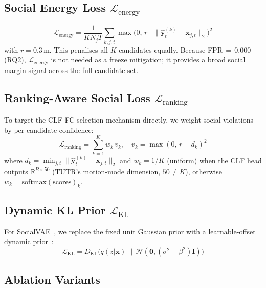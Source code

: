 \documentclass[journal]{IEEEtran}
\begin{document}
\subsection{Social Energy Loss $\mathcal{L}_{\text{energy}}$}

\begin{equation}
  \mathcal{L}_{\text{energy}} = \frac{1}{KN_jT}
  \sum_{k,j,t}\max\!\bigl(0,\,r-\|\hat{\mathbf{y}}^{(k)}_t
  -\mathbf{x}_{j,t}\|_2\bigr)^2
  \label{eq:lenergy}
\end{equation}
with $r{=}0.3$\,m. This penalises all $K$ candidates equally.
Because FPR\,\(=\,0.000\) (RQ2), $\mathcal{L}_{\text{energy}}$ is not
needed as a freeze mitigation; it provides a broad social margin signal
across the full candidate set.

\subsection{Ranking-Aware Social Loss $\mathcal{L}_{\text{ranking}}$}

To target the CLF-FC selection mechanism directly, we weight social
violations by per-candidate confidence:
\begin{equation}
  \mathcal{L}_{\text{ranking}} = \sum_{k=1}^{K} w_k\,v_k, \quad
  v_k = \max(0,\,r-d_k)^2
  \label{eq:lranking}
\end{equation}
where $d_k=\min_{j,t}\|\hat{\mathbf{y}}^{(k)}_t-\mathbf{x}_{j,t}\|_2$
and $w_k{=}1/K$ (uniform) when the CLF head outputs
$\mathbb{R}^{B\times 50}$ (TUTR's motion-mode dimension, $50\neq K$),
otherwise $w_k{=}\mathrm{softmax}(\mathrm{scores})_k$.

\subsection{Dynamic KL Prior $\mathcal{L}_{\text{KL}}$}

For SocialVAE~\cite{xu2022socialvae}, we replace the fixed unit
Gaussian prior with a learnable-offset dynamic
prior~\cite{zhang2025openworld}:
\begin{equation}
  \mathcal{L}_{\text{KL}} =
  D_{\mathrm{KL}}\!\bigl(q(z|\mathbf{x})\,\|\,
  \mathcal{N}(\mathbf{0},(\sigma^2+\beta^2)\mathbf{I})\bigr)
  \label{eq:lkl}
\end{equation}

\subsection{Ablation Variants}
\end{document}
